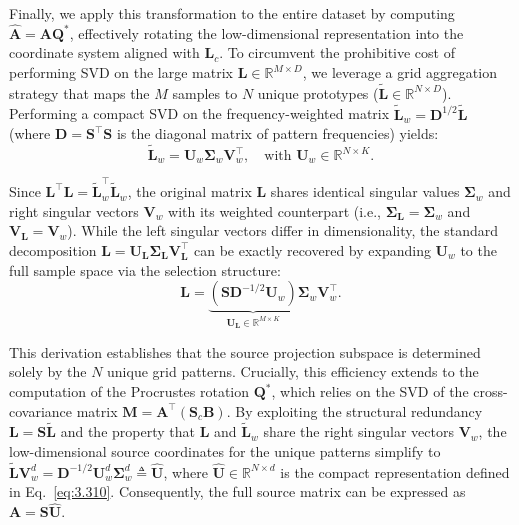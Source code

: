 Finally, we apply this transformation to the entire dataset by computing $\hat{\mathbf{A}} = \mathbf{A} \mathbf{Q}^*$, effectively rotating the low-dimensional representation into the coordinate system aligned with $\mathbf{L}_c$. To circumvent the prohibitive cost of performing SVD on the large matrix $\mathbf{L} \in \mathbb{R}^{M \times D}$, we leverage a grid aggregation strategy that maps the $M$ samples to $N$ unique prototypes ($\tilde{\mathbf{L}} \in \mathbb{R}^{N \times D}$). Performing a compact SVD on the frequency-weighted matrix $\tilde{\mathbf{L}}_w = \mathbf{D}^{1/2}\tilde{\mathbf{L}}$ (where $\mathbf{D}=\mathbf{S}^\top\mathbf{S}$ is the diagonal matrix of pattern frequencies) yields:
\begin{equation}
    \tilde{\mathbf{L}}_w = \mathbf{U}_w \mathbf{\Sigma}_w \mathbf{V}_w^\top, \quad \text{with } \mathbf{U}_w \in \mathbb{R}^{N \times K}.
    \label{eq:svd_weighted}
\end{equation}

Since $\mathbf{L}^\top\mathbf{L} = \tilde{\mathbf{L}}_w^\top\tilde{\mathbf{L}}_w$, the original matrix $\mathbf{L}$ shares identical singular values $\mathbf{\Sigma}_w$ and right singular vectors $\mathbf{V}_w$ with its weighted counterpart (i.e., $\mathbf{\Sigma}_\mathbf{L} = \mathbf{\Sigma}_w$ and $\mathbf{V}_{\mathbf{L}} = \mathbf{V}_w$). While the left singular vectors differ in dimensionality, the standard decomposition $\mathbf{L} = \mathbf{U}_\mathbf{L} \mathbf{\Sigma}_\mathbf{L} \mathbf{V}_{\mathbf{L}}^\top$ can be exactly recovered by expanding $\mathbf{U}_w$ to the full sample space via the selection structure:
\begin{equation}
    \mathbf{L} = \underbrace{(\mathbf{S} \mathbf{D}^{-1/2} \mathbf{U}_w)}_{\mathbf{U}_\mathbf{L} \in \mathbb{R}^{M \times K}} \mathbf{\Sigma}_w \mathbf{V}_w^\top.
    \label{eq:recovered_svd_unified}
\end{equation}

This derivation establishes that the source projection subspace is determined solely by the $N$ unique grid patterns. Crucially, this efficiency extends to the computation of the Procrustes rotation $\mathbf{Q}^*$, which relies on the SVD of the cross-covariance matrix $\mathbf{M} = \mathbf{A}^\top (\mathbf{S}_c \mathbf{B})$. By exploiting the structural redundancy $\mathbf{L} = \mathbf{S}\tilde{\mathbf{L}}$ and the property that $\mathbf{L}$ and $\tilde{\mathbf{L}}_w$ share the right singular vectors $\mathbf{V}_w$, the low-dimensional source coordinates for the unique patterns simplify to $\tilde{\mathbf{L}}\mathbf{V}_w^d = \mathbf{D}^{-1/2} \mathbf{U}_w^d \mathbf{\Sigma}_w^d \triangleq \hat{\mathbf{U}}$, where $\hat{\mathbf{U}} \in \mathbb{R}^{N \times d}$ is the compact representation defined in Eq.~\ref{eq:3.310}. Consequently, the full source matrix can be expressed as $\mathbf{A} = \mathbf{S}\hat{\mathbf{U}}$.

